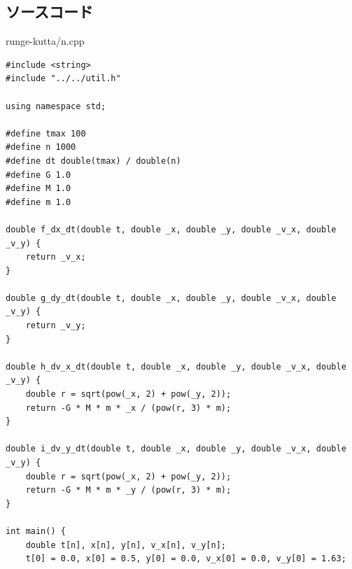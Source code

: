 \documentclass[a4paper,twoside]{jarticle}
\begin{document}
\subsection{ソースコード}
runge-kutta/n.cpp
\begin{lstlisting}
#include <string>
#include "../../util.h"

using namespace std;

#define tmax 100
#define n 1000
#define dt double(tmax) / double(n)
#define G 1.0
#define M 1.0
#define m 1.0

double f_dx_dt(double t, double _x, double _y, double _v_x, double _v_y) {
    return _v_x;
}

double g_dy_dt(double t, double _x, double _y, double _v_x, double _v_y) {
    return _v_y;
}

double h_dv_x_dt(double t, double _x, double _y, double _v_x, double _v_y) {
    double r = sqrt(pow(_x, 2) + pow(_y, 2));
    return -G * M * m * _x / (pow(r, 3) * m);
}

double i_dv_y_dt(double t, double _x, double _y, double _v_x, double _v_y) {
    double r = sqrt(pow(_x, 2) + pow(_y, 2));
    return -G * M * m * _y / (pow(r, 3) * m);
}

int main() {
    double t[n], x[n], y[n], v_x[n], v_y[n];
    t[0] = 0.0, x[0] = 0.5, y[0] = 0.0, v_x[0] = 0.0, v_y[0] = 1.63;


\end{lstlisting}
\end{document}
